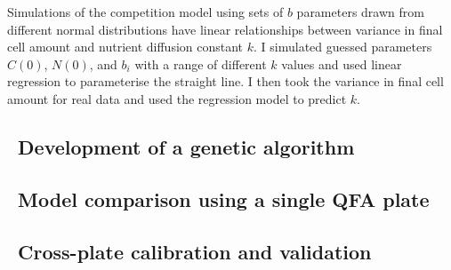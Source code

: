 Simulations of the competition model using sets of \(b\) parameters
drawn from different normal distributions have linear relationships
between variance in final cell amount and nutrient diffusion constant
\(k\). I simulated guessed parameters \(C(0)\), \(N(0)\), and
\(b_{i}\) with a range of different \(k\) values and used linear
regression to parameterise the straight line. I then took the variance
in final cell amount for real data and used the regression model to
predict \(k\).

\subsection{\thesubsection~Development of a genetic algorithm}


\subsection{\thesubsection~Model comparison using a single QFA plate}

\subsection{\thesubsection~Cross-plate calibration and validation}
%


